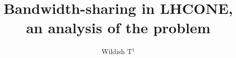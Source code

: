 \documentclass[a4paper]{jpconf}
\begin{document}
\title{Bandwidth-sharing in LHCONE, an analysis of the problem}

\author{Wildish T$^1$}

\address{$^1$ Princeton University, New Jersey, USA}








% 
% 
% 
% 

\par

\end{document}
